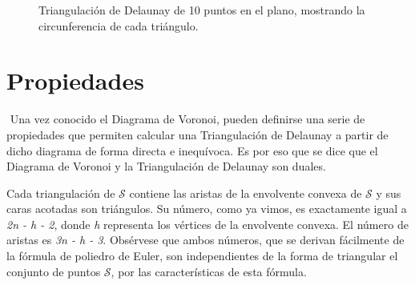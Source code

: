 \begin{figure}[H]
    \caption{Triangulación de Delaunay de 10 puntos en el plano, mostrando la circunferencia de cada triángulo.} \label{fig:tri}
\end{figure} 

\section{Propiedades}$\label{propDT}$
Una vez conocido el Diagrama de Voronoi, pueden definirse una serie de propiedades que permiten calcular una Triangulación de Delaunay a partir de dicho diagrama de forma directa e inequívoca. Es por eso que se dice que el Diagrama de Voronoi y la Triangulación de Delaunay son duales.  
\vspace{0.3cm}

Cada triangulación de $\mathcal{S}$ contiene las aristas de la envolvente convexa de $\mathcal{S}$ y sus caras acotadas son triángulos. Su número, como ya vimos, es exactamente igual a \textit{2n - h - 2}, donde \textit{h} representa los vértices de la envolvente convexa. El número de aristas es \textit{3n - h - 3}. Obsérvese que ambos números, que se derivan fácilmente de la fórmula de poliedro de Euler, son independientes de la forma de triangular el conjunto de puntos $\mathcal{S}$, por las características de esta fórmula. 
\vspace{0.3cm}

